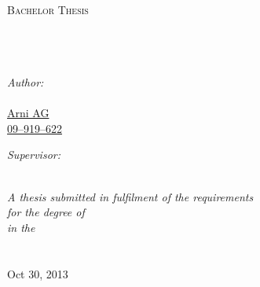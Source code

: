 \documentclass[11pt, a4paper, oneside]{Thesis} %
\begin{document}
\begin{titlepage}
\begin{center}

\textsc{\LARGE \univname}\\[1.5cm] %
\textsc{\Large Bachelor Thesis}\\[0.5cm] %

\HRule \\[0.4cm] %
{\huge \bfseries \ttitle}\\[0.4cm] %
\HRule \\[1.5cm] %
 
\begin{minipage}{0.45\textwidth}
\begin{flushleft} \large
\emph{Author:}\\
\href{http://www.sleepy-robots.org}{\authornames \\ Arni AG \\ 09--919--622} %
\end{flushleft}
\end{minipage}
\begin{minipage}{0.45\textwidth}
\begin{flushright} \large
\emph{Supervisor:} \\
\href{http://www.ailab.ifi.uzh.ch}{\supname} %
\end{flushright}
\end{minipage}\\[3cm]
 
\large \textit{A thesis submitted in fulfilment of the requirements\\ for the degree of \degreename}\\[0.3cm] %
\textit{in the}\\[0.4cm]
\groupname\\\deptname\\[2cm] %
 
{\large Oct 30, 2013}\\[2.5cm] %
 
\vfill
\end{center}

\end{titlepage}

\end{document}
